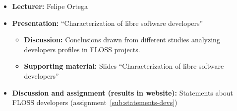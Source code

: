 \documentclass[a4paper]{article}
\begin{document}
\begin{itemize}
\item \textbf{Lecturer:} Felipe Ortega
\item \textbf{Presentation:} ``Characterization of libre software developers''
  \begin{itemize}
  \item \textbf{Discussion:} Conclusions drawn from different studies analyzing developers profiles in FLOSS projects.
  \item \textbf{Supporting material:} Slides ``Characterization of libre software developers''
  \end{itemize}
\item \textbf{Discussion and assignment (results in website):} Statements about FLOSS developers (assignment~\ref{sub:statements-devs})
\end{itemize}
\end{document}
